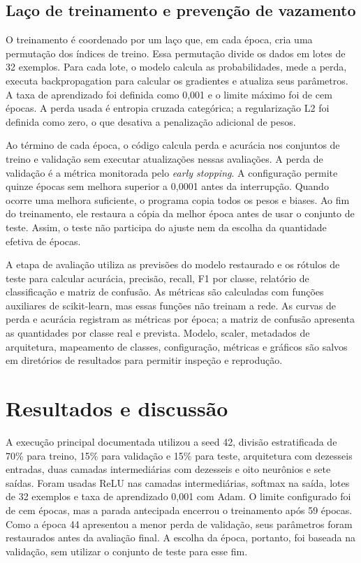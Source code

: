 \documentclass[12pt]{article}
\begin{document}
\subsection{Laço de treinamento e prevenção de vazamento}

O treinamento é coordenado por um laço que, em cada época, cria uma permutação dos índices de treino. Essa permutação divide os dados em lotes de 32 exemplos. Para cada lote, o modelo calcula as probabilidades, mede a perda, executa backpropagation para calcular os gradientes e atualiza seus parâmetros. A taxa de aprendizado foi definida como 0,001 e o limite máximo foi de cem épocas. A perda usada é entropia cruzada categórica; a regularização L2 foi definida como zero, o que desativa a penalização adicional de pesos.

Ao término de cada época, o código calcula perda e acurácia nos conjuntos de treino e validação sem executar atualizações nessas avaliações. A perda de validação é a métrica monitorada pelo \textit{early stopping}. A configuração permite quinze épocas sem melhora superior a 0,0001 antes da interrupção. Quando ocorre uma melhora suficiente, o programa copia todos os pesos e biases. Ao fim do treinamento, ele restaura a cópia da melhor época antes de usar o conjunto de teste. Assim, o teste não participa do ajuste nem da escolha da quantidade efetiva de épocas.

A etapa de avaliação utiliza as previsões do modelo restaurado e os rótulos de teste para calcular acurácia, precisão, recall, F1 por classe, relatório de classificação e matriz de confusão. As métricas são calculadas com funções auxiliares de scikit-learn, mas essas funções não treinam a rede. As curvas de perda e acurácia registram as métricas por época; a matriz de confusão apresenta as quantidades por classe real e prevista. Modelo, scaler, metadados de arquitetura, mapeamento de classes, configuração, métricas e gráficos são salvos em diretórios de resultados para permitir inspeção e reprodução.

\section{Resultados e discussão}

A execução principal documentada utilizou a seed 42, divisão estratificada de 70\% para treino, 15\% para validação e 15\% para teste, arquitetura com dezesseis entradas, duas camadas intermediárias com dezesseis e oito neurônios e sete saídas. Foram usadas ReLU nas camadas intermediárias, softmax na saída, lotes de 32 exemplos e taxa de aprendizado 0,001 com Adam. O limite configurado foi de cem épocas, mas a parada antecipada encerrou o treinamento após 59 épocas. Como a época 44 apresentou a menor perda de validação, seus parâmetros foram restaurados antes da avaliação final. A escolha da época, portanto, foi baseada na validação, sem utilizar o conjunto de teste para esse fim.
\end{document}
